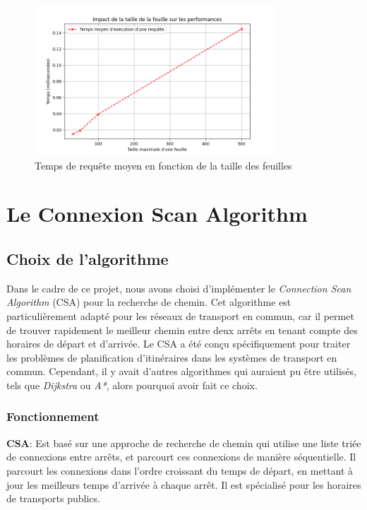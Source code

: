 \documentclass[12pt]{article}
\begin{document}
\begin{figure}[h]
    \centering
    \includegraphics[width=0.8\textwidth]{images/average-query-time.png}
    \caption{Temps de requête moyen en fonction de la taille des feuilles}
\end{figure}


\newpage
\section{Le Connexion Scan Algorithm}
\subsection{Choix de l'algorithme}
Dans le cadre de ce projet, nous avons choisi d'implémenter le \emph{Connection Scan Algorithm} (CSA) pour la recherche de chemin.
Cet algorithme est particulièrement adapté pour les réseaux de transport en commun, car il permet de trouver rapidement le meilleur chemin
entre deux arrêts en tenant compte des horaires de départ et d'arrivée. Le CSA a été conçu spécifiquement pour traiter les problèmes de planification d'itinéraires 
dans les systèmes de transport en commun. Cependant, il y avait d'autres algorithmes qui auraient pu être utilisés, tels que \emph{Dijkstra} ou \emph{A*}, 
alors pourquoi avoir fait ce choix.

\subsubsection{Fonctionnement}
\textbf{CSA}: Est basé sur une approche de recherche de chemin qui utilise une liste triée de connexions entre arrêts, et parcourt ces connexions de manière séquentielle.
Il parcourt les connexions dans l'ordre croissant du temps de départ, en mettant à jour les meilleurs temps d'arrivée à chaque arrêt. Il est
spécialisé pour les horaires de transports publics. 
\end{document}

